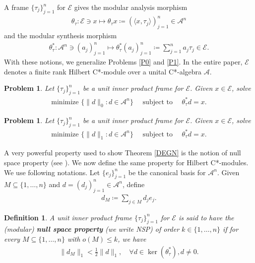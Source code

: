 \documentclass{amsart}
\newtheorem{definition}[theorem]{Definition}
\newtheorem{problem}[theorem]{Problem}
\begin{document}
A frame $\{\tau_j\}_{j=1}^n$ for  $\mathcal{E}$ gives the modular analysis morphism 
\begin{align*}
	\theta_\tau:\mathcal{E}\ni x \mapsto 	\theta_\tau x \coloneqq (\langle x,  \tau_j \rangle)_{j=1}^n \in \mathcal{A}^n 
\end{align*}
and the modular synthesis morphism  
\begin{align*}
	\theta_\tau^*: \mathcal{A}^n \ni (a_j)_{j=1}^n \mapsto\theta_\tau^*(a_j)_{j=1}^n\coloneqq \sum_{j=1}^{n}a_j\tau_j \in \mathcal{E}.
\end{align*}
With these notions, we generalize  Problems \ref{P0} and  \ref{P1}. In the entire paper,  $\mathcal{E}$ denotes a finite rank  Hilbert C*-module over a  unital C*-algebra $\mathcal{A}$.
\begin{problem}  \label{BP0}
Let $\{\tau_j\}_{j=1}^n $  be a unit inner product frame  for  $\mathcal{E}$.	Given $x \in \mathcal{E}$, solve 	
	\begin{align*}
		\text{minimize }\{\|d\|_0:d\in \mathcal{A}^n\} \quad \text{ subject to } \quad \theta_\tau^* d=x.
	\end{align*}
\end{problem}
\begin{problem}  \label{BP1}
	Let $\{\tau_j\}_{j=1}^n $  be a unit inner product frame for  $\mathcal{E}$.	Given $x \in \mathcal{E}$, solve 	
	\begin{align*}
		\text{minimize }\{\|d\|_1:d\in  \mathcal{A}^n\} \quad \text{ subject to } \quad \theta_\tau^* d=x.
	\end{align*}
\end{problem}
A very powerful property used to show Theorem \ref{DEGN}  is the notion of null space property (see \cite{KUTYNIOK, COHENDAHMENDEVORE}). We now define the same property for Hilbert C*-modules. We use following notations. Let $\{e_j \}_{j=1}^n$ be the canonical  basis for $\mathcal{A}^n$. Given $M\subseteq \{1, \dots, n\}$ and $d=(d_j)_{j=1}^n \in \mathcal{A}^n$,  define 
\begin{align*}
	d_M\coloneqq \sum_{j\in M}d_je_j.
\end{align*}
\begin{definition}
A unit inner product   frame  $\{\tau_j \}_{j=1}^n$ for   $\mathcal{E}$ is said to have the (modular) \textbf{null space property} (we write NSP) of order $k\in  \{1, \dots, n\}$ if 	for every $ M \subseteq  \{1, \dots, n\} $ with $o(M)\leq k$, we have
\begin{align*}
	\|d_M\|_1<\frac{1}{2}\|d\|_1,  \quad  \forall d \in \ker(\theta_\tau^*), d \neq 0.
\end{align*}
\end{definition}
\end{document}
